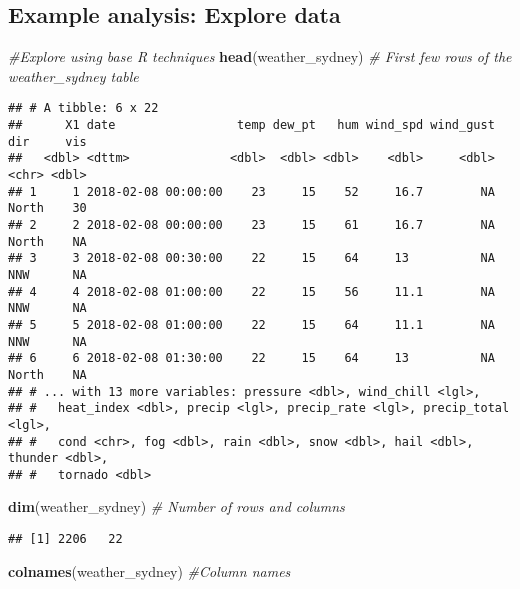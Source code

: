 \documentclass[
]{article}
\newenvironment{Shaded}{\begin{snugshade}}{\end{snugshade}}
\newcommand{\CommentTok}[1]{\textcolor[rgb]{0.56,0.35,0.01}{\textit{#1}}}
\newcommand{\KeywordTok}[1]{\textcolor[rgb]{0.13,0.29,0.53}{\textbf{#1}}}
\newcommand{\NormalTok}[1]{#1}
\begin{document}
\hypertarget{example-analysis-explore-data}{%
\subsection{Example analysis: Explore
data}\label{example-analysis-explore-data}}

\begin{Shaded}
\begin{Highlighting}[]
\CommentTok{#Explore using base R techniques}
\KeywordTok{head}\NormalTok{(weather_sydney) }\CommentTok{# First few rows of the weather_sydney table}
\end{Highlighting}
\end{Shaded}

\begin{verbatim}
## # A tibble: 6 x 22
##      X1 date                 temp dew_pt   hum wind_spd wind_gust dir     vis
##   <dbl> <dttm>              <dbl>  <dbl> <dbl>    <dbl>     <dbl> <chr> <dbl>
## 1     1 2018-02-08 00:00:00    23     15    52     16.7        NA North    30
## 2     2 2018-02-08 00:00:00    23     15    61     16.7        NA North    NA
## 3     3 2018-02-08 00:30:00    22     15    64     13          NA NNW      NA
## 4     4 2018-02-08 01:00:00    22     15    56     11.1        NA NNW      NA
## 5     5 2018-02-08 01:00:00    22     15    64     11.1        NA NNW      NA
## 6     6 2018-02-08 01:30:00    22     15    64     13          NA North    NA
## # ... with 13 more variables: pressure <dbl>, wind_chill <lgl>,
## #   heat_index <dbl>, precip <lgl>, precip_rate <lgl>, precip_total <lgl>,
## #   cond <chr>, fog <dbl>, rain <dbl>, snow <dbl>, hail <dbl>, thunder <dbl>,
## #   tornado <dbl>
\end{verbatim}

\begin{Shaded}
\begin{Highlighting}[]
\KeywordTok{dim}\NormalTok{(weather_sydney) }\CommentTok{# Number of rows and columns}
\end{Highlighting}
\end{Shaded}

\begin{verbatim}
## [1] 2206   22
\end{verbatim}

\begin{Shaded}
\begin{Highlighting}[]
\KeywordTok{colnames}\NormalTok{(weather_sydney) }\CommentTok{#Column names}
\end{Highlighting}
\end{Shaded}
\end{document}
